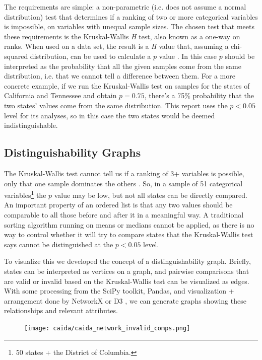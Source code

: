 The requirements are simple: a non-parametric (i.e. does not assume a normal distribution) test that determines if a ranking of two or more categorical variables is impossible, on variables with unequal sample sizes. The chosen test that meets these requirements is the Kruskal-Wallis \textit{H} test, also known as a one-way \anova on ranks. When used on a data set, the result is a \textit{H} value that, assuming a chi-squared distribution, can be used to calculate a $p$ value \cite{kruskal-wallis}. In this case $p$ should be interpreted as the probability that all the given samples come from the same distribution, i.e. that we cannot tell a difference between them. For a more concrete example, if we run the Kruskal-Wallis test on samples for the states of California and Tennessee and obtain $p=0.75$, there's a 75\% probability that the two states' values come from the same distribution. This report uses the $p<0.05$ level for its analyses, so in this case the two states would be deemed indistinguishable.

\subsection{Distinguishability Graphs}

The Kruskal-Wallis test cannot tell us if a ranking of 3+ variables is possible, only that one sample dominates the others \cite{kruskal-wallis}. So, in a sample of 51 categorical variables\footnote{50 states + the District of Columbia.} the $p$ value may be low, but not all states can be directly compared. An important property of an ordered list is that any two values should be comparable to all those before and after it in a meaningful way. A traditional sorting algorithm running on means or medians cannot be applied, as there is no way to control whether it will try to compare states that the Kruskal-Wallis test says cannot be distinguished at the $p<0.05$ level.

To visualize this we developed the concept of a distinguishability graph. Briefly, states can be interpreted as vertices on a graph, and pairwise comparisons that are valid or invalid based on the Kruskal-Wallis test can be visualized as edges. With some processing from the SciPy toolkit, Pandas, and visualization + arrangement done by NetworkX or D3 \cite{scipy, pandas, networkx, Bostock2011a}, we can generate graphs showing these relationships and relevant attributes.

\begin{figure}[h]
    \centering
    \texttt{[image: caida/caida\_network\_invalid\_comps.png]}
\end{figure}

